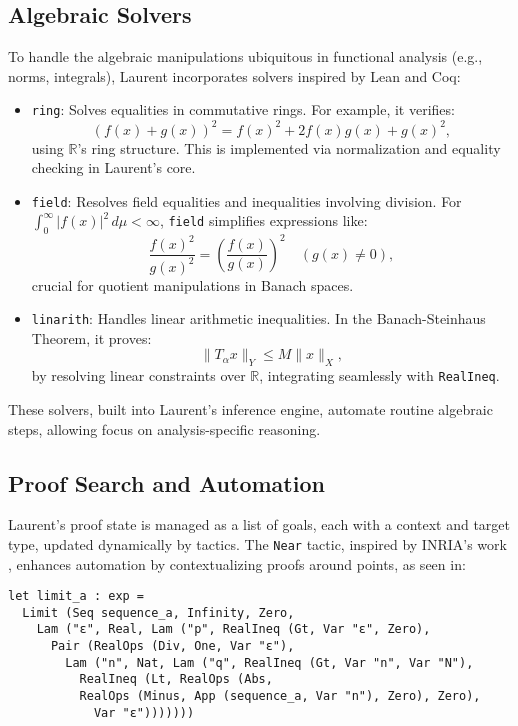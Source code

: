 \documentclass[12pt,twoside,draft]{cmpart}
\begin{document}
\subsection{Algebraic Solvers}
To handle the algebraic manipulations ubiquitous in functional analysis (e.g., norms, integrals), Laurent incorporates solvers inspired by Lean and Coq:
\begin{itemize}
\item \texttt{ring}: Solves equalities in commutative rings. For example, it verifies:
\[
(f(x) + g(x))^2 = f(x)^2 + 2 f(x) g(x) + g(x)^2,
\]
using $\mathbb{R}$’s ring structure. This is implemented via normalization and equality checking in Laurent’s core.
\item \texttt{field}: Resolves field equalities and inequalities involving division. For $\int_0^\infty |f(x)|^2 \, d\mu < \infty$, \texttt{field} simplifies expressions like:
\[
\frac{f(x)^2}{g(x)^2} = \left( \frac{f(x)}{g(x)} \right)^2 \quad (g(x) \neq 0),
\]
crucial for quotient manipulations in Banach spaces.

\item \texttt{linarith}: Handles linear arithmetic inequalities. In the Banach-Steinhaus Theorem, it proves:
\[
\| T_\alpha x \|_Y \leq M \| x \|_X,
\]
by resolving linear constraints over $\mathbb{R}$, integrating seamlessly with \texttt{RealIneq}.
\end{itemize}
These solvers, built into Laurent’s inference engine, automate routine algebraic steps, allowing focus on analysis-specific reasoning.

\subsection{Proof Search and Automation}
Laurent’s proof state is managed as a list of goals, each with a context
and target type, updated dynamically by tactics. The \texttt{Near} tactic,
inspired by INRIA’s work \cite{af18}, enhances automation by contextualizing
proofs around points, as seen in:

\begin{verbatim}
let limit_a : exp =
  Limit (Seq sequence_a, Infinity, Zero,
    Lam ("ε", Real, Lam ("p", RealIneq (Gt, Var "ε", Zero),
      Pair (RealOps (Div, One, Var "ε"),
        Lam ("n", Nat, Lam ("q", RealIneq (Gt, Var "n", Var "N"),
          RealIneq (Lt, RealOps (Abs,
          RealOps (Minus, App (sequence_a, Var "n"), Zero), Zero),
            Var "ε")))))))
\end{verbatim}
\end{document}
